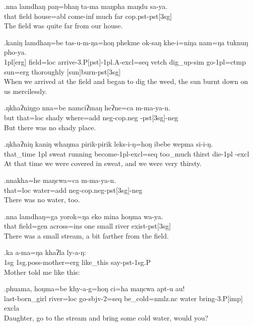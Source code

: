 \exg.nna  lamdhaŋ paŋ=bhaŋ    ta-ma      maŋpha maŋdu sa-ya.\\
 that field    house{\sc =abl}  come{\sc -inf} much    far    {\sc cop.pst-pst[3sg]}\\
The field was quite far from our house.

\exg.kaniŋ lamdhaŋ=be    tas-u-m-ŋa=hoŋ                       phekme ok-saŋ          khe-i=niŋa         nam=ŋa   tuknuŋ    pho-ya.\\
 {\sc 1pl[erg]}   field{\sc =loc} arrive{\sc -3.P[pst]-1pl.A-excl=seq} vetch  dig\_up{\sc -sim} go{\sc  -1pl=ctmp} sun{\sc =erg} thoroughly [sun]burn{\sc -pst[3sg]}\\
When we arrived at the field and began to dig the weed, the sun burnt down on us mercilessly.

\exg.ŋkhaʔniŋgo nna=be     namciʔmaŋ heʔne=ca        m-ma-ya-n.\\
 but           that{\sc =loc} shady       where{\sc =add} {\sc neg-cop.neg -pst[3sg]-neg}\\
But there was no shady place.

\exg.ŋkhaʔniŋ kaniŋ whaŋma pirik-pirik    leks-i-ŋ=hoŋ               ibebe    wepma  si-i-ŋ.\\
 that\_time   {\sc 1pl}   sweat   running become{\sc -1pl-excl=seq}  too\_much thirst die{\sc -1pl -excl}\\
At that time we were covered in sweat, and we were very thirsty.

\exg.nnakha=he    maŋcwa=ca        m-ma-ya-n.\\
 that{\sc =loc} water{\sc =add} {\sc neg-cop.neg-pst[3sg]-neg}\\
There was no water, too.

\exg.nna  lamdhaŋ=ga    yorok=ŋa        eko mina  hoŋma wa-ya.\\
 that field{\sc =gen} across{\sc =ins} one small river  exist{\sc -pst[3sg]}\\
There was a small stream, a bit farther from the field.

\exg.ka  a-ma=ŋa                khaʔla   ly-a-ŋ:\\
 {\sc 1sg} {\sc 1sg.poss-}mother{\sc =erg} like\_this say{\sc -pst-1sg.P}\\
Mother told me like this:

\exg.phuama,         hoŋma=be    khy-a-g=hoŋ             ci=ha                  maŋcwa apt-u           au!\\
 last-born\_girl river{\sc =loc} go{\sc -sbjv-2=seq}  be\_cold{\sc =nmlz.nc} water   bring{\sc -3.P[imp]} {\sc excla}\\
Daughter, go to the stream and bring some cold water, would you?

